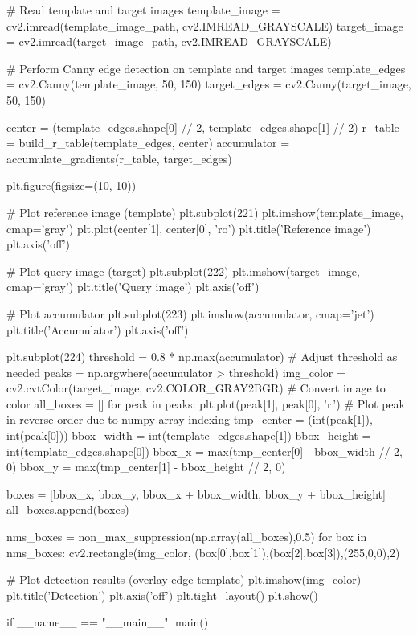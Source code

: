 \documentclass[10pt]{article}
\begin{document}
\begin{python}
    # Read template and target images
    template_image = cv2.imread(template_image_path, cv2.IMREAD_GRAYSCALE)
    target_image = cv2.imread(target_image_path, cv2.IMREAD_GRAYSCALE)

    # Perform Canny edge detection on template and target images
    template_edges = cv2.Canny(template_image, 50, 150)
    target_edges = cv2.Canny(target_image, 50, 150)

    center = (template_edges.shape[0] // 2, template_edges.shape[1] // 2)
    r_table = build_r_table(template_edges, center)
    accumulator = accumulate_gradients(r_table, target_edges)

    plt.figure(figsize=(10, 10))

    # Plot reference image (template)
    plt.subplot(221)
    plt.imshow(template_image, cmap='gray')
    plt.plot(center[1], center[0], 'ro')
    plt.title('Reference image')
    plt.axis('off')

    # Plot query image (target)
    plt.subplot(222)
    plt.imshow(target_image, cmap='gray')
    plt.title('Query image')
    plt.axis('off')

    # Plot accumulator
    plt.subplot(223)
    plt.imshow(accumulator, cmap='jet')
    plt.title('Accumulator')
    plt.axis('off')

    plt.subplot(224)
    threshold = 0.8 * np.max(accumulator)  # Adjust threshold as needed
    peaks = np.argwhere(accumulator > threshold)
    img_color = cv2.cvtColor(target_image, cv2.COLOR_GRAY2BGR)  # Convert image to color
    all_boxes = []
    for peak in peaks:
        plt.plot(peak[1], peak[0], 'r.')  # Plot peak in reverse order due to numpy array indexing
        tmp_center = (int(peak[1]), int(peak[0]))
        bbox_width = int(template_edges.shape[1])
        bbox_height = int(template_edges.shape[0])
        bbox_x = max(tmp_center[0] - bbox_width // 2, 0)
        bbox_y = max(tmp_center[1] - bbox_height // 2, 0)

        boxes = [bbox_x, bbox_y, bbox_x + bbox_width, bbox_y + bbox_height]
        all_boxes.append(boxes)
        
    nms_boxes = non_max_suppression(np.array(all_boxes),0.5)
    for box in nms_boxes:
        cv2.rectangle(img_color, (box[0],box[1]),(box[2],box[3]),(255,0,0),2)
        
    # Plot detection results (overlay edge template)
    plt.imshow(img_color)
    plt.title('Detection')
    plt.axis('off')
    plt.tight_layout()
    plt.show()
    
if __name__ == "__main__":
    main()
\end{python}
\end{document}
